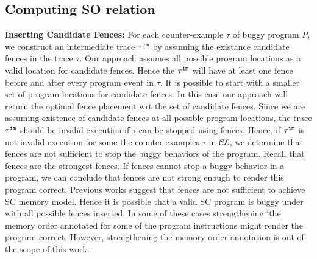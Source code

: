 

\subsection{Computing SO relation}
\noindent\textbf{Inserting Candidate Fences:}
For each counter-example $ \tau $ of buggy program $ P $, we 
construct an intermediate trace $ {\tau}^{\mathtt{im}} $ by assuming the existance candidate fences in the trace $ \tau $.
Our approach assumes all possible program locations as a valid location 
for candidate fences. 
Hence the $ {\tau}^{\mathtt{im}} $ will have at least one \mosc fence before and after every program event in $ \tau $.
It is possible to start with a smaller set of program locations for 
candidate fences. 
In this case our approach will return the optimal fence placement wrt the 
set of candidate fences.
Since we are assuming existence of candidate fences at all possible 
program locations, the trace $ {\tau}^{\mathtt{im}} $ should be invalid \cc execution 
if $ \tau $ can be stopped using \mosc fences.
Hence, if $ {\tau}^{\mathtt{im}} $ is not invalid \cc execution for some 
the counter-examples $ \tau $ in $ \mathcal{CE} $, we determine that \mosc 
fences are not sufficient to stop the buggy behaviors of the program.
Recall that \mosc fences are the strongest \cc fences. 
If \mosc fences cannot stop a buggy behavior in a program, we can conclude 
that \cc fences are not strong enough to render this program correct.
Previous works \cite{LahavVafeiadis-PLDI17,Batty-POPL12} suggest that \mosc fences are not sufficient to achieve SC memory 
model. 
Hence it is possible that a valid SC program is buggy under \cc with all 
possible \mosc fences inserted. 
In some of these cases strengthening `the memory order annotated for some 
of the program instructions might render the program correct. 
However, strengthening the memory order annotation is out of the scope of this work. 

